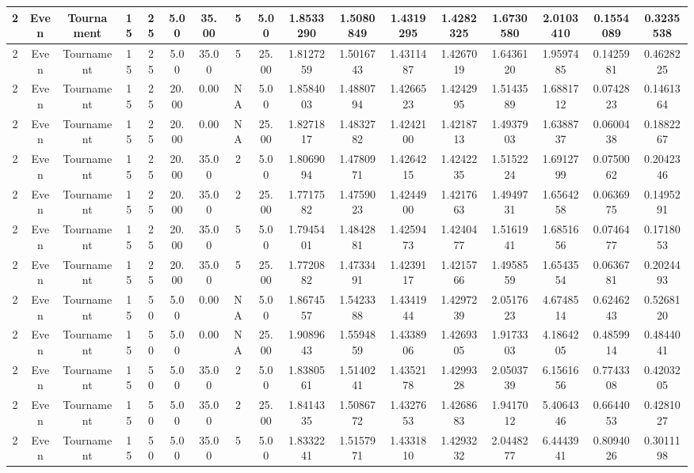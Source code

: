 \documentclass[a4paper]{article}
\begin{document}
\begin{center}
\begin{tabular}{ | c | c | c | c | c | c | c | c | c | c | c | c | c | c | c | c | c | }
		\hline
		2	&	Even	&	Tournament	&	15	&	25	&	5.00	&	35.00	&	5	&	5.00	&	1.8533290	&	1.5080849	&	1.4319295	&	1.4282325	&	1.6730580	&	2.0103410	&	0.1554089	&	0.3235538 \\
		\hline
		2	&	Even	&	Tournament	&	15	&	25	&	5.00	&	35.00	&	5	&	25.00	&	1.8127259	&	1.5016743	&	1.4311487	&	1.4267019	&	1.6436120	&	1.9597485	&	0.1425981	&	0.4628225 \\
		\hline
		2	&	Even	&	Tournament	&	15	&	25	&	20.00	&	0.00	&	NA	&	5.00	&	1.8584003	&	1.4880794	&	1.4266523	&	1.4242995	&	1.5143589	&	1.6881712	&	0.0742823	&	0.1461364 \\
		\hline
		2	&	Even	&	Tournament	&	15	&	25	&	20.00	&	0.00	&	NA	&	25.00	&	1.8271817	&	1.4832782	&	1.4242100	&	1.4218713	&	1.4937903	&	1.6388737	&	0.0600438	&	0.1882267 \\
		\hline
		2	&	Even	&	Tournament	&	15	&	25	&	20.00	&	35.00	&	2	&	5.00	&	1.8069094	&	1.4780971	&	1.4264215	&	1.4242235	&	1.5152224	&	1.6912799	&	0.0750062	&	0.2042346 \\
		\hline
		2	&	Even	&	Tournament	&	15	&	25	&	20.00	&	35.00	&	2	&	25.00	&	1.7717582	&	1.4759023	&	1.4244900	&	1.4217663	&	1.4949731	&	1.6564258	&	0.0636975	&	0.1495291 \\
		\hline
		2	&	Even	&	Tournament	&	15	&	25	&	20.00	&	35.00	&	5	&	5.00	&	1.7945401	&	1.4842881	&	1.4259473	&	1.4240477	&	1.5161941	&	1.6851656	&	0.0746477	&	0.1718053 \\
		\hline
		2	&	Even	&	Tournament	&	15	&	25	&	20.00	&	35.00	&	5	&	25.00	&	1.7720882	&	1.4733491	&	1.4239117	&	1.4215766	&	1.4958559	&	1.6543554	&	0.0636781	&	0.2024493 \\
		\hline
		2	&	Even	&	Tournament	&	15	&	50	&	5.00	&	0.00	&	NA	&	5.00	&	1.8674557	&	1.5423388	&	1.4341944	&	1.4297239	&	2.0517623	&	4.6748514	&	0.6246243	&	0.5268120 \\
		\hline
		2	&	Even	&	Tournament	&	15	&	50	&	5.00	&	0.00	&	NA	&	25.00	&	1.9089643	&	1.5594859	&	1.4338906	&	1.4269305	&	1.9173303	&	4.1864205	&	0.4859914	&	0.4844041 \\
		\hline
		2	&	Even	&	Tournament	&	15	&	50	&	5.00	&	35.00	&	2	&	5.00	&	1.8380561	&	1.5140241	&	1.4352178	&	1.4299328	&	2.0503739	&	6.1561656	&	0.7743308	&	0.4203205 \\
		\hline
		2	&	Even	&	Tournament	&	15	&	50	&	5.00	&	35.00	&	2	&	25.00	&	1.8414335	&	1.5086772	&	1.4327653	&	1.4268683	&	1.9417012	&	5.4064346	&	0.6644053	&	0.4281027 \\
		\hline
		2	&	Even	&	Tournament	&	15	&	50	&	5.00	&	35.00	&	5	&	5.00	&	1.8332241	&	1.5157971	&	1.4331810	&	1.4293232	&	2.0448277	&	6.4443941	&	0.8094026	&	0.3011198 \\

\end{tabular}
\end{center}
\end{document}
